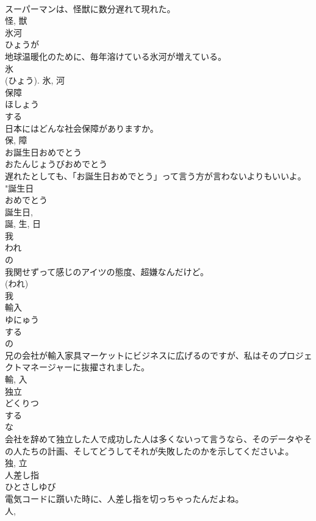\documentclass[8pt]{extreport}
\begin{document}
\begin{CJK}{UTF8}{min}
\\	スーパーマンは、怪獣に数分遅れて現れた。	
\\	怪, 獣	
\\	氷河	
\\	ひょうが	
\\	地球温暖化のために、毎年溶けている氷河が増えている。	
\\	氷 
\\	(ひょう).	氷, 河	
\\	保障	
\\	ほしょう	
\\	する 
\\	日本にはどんな社会保障がありますか。	
\\	保, 障	
\\	お誕生日おめでとう	
\\	おたんじょうびおめでとう	
\\	遅れたとしても、「お誕生日おめでとう」って言う方が言わないよりもいいよ。	
\\	"誕生日 
\\	おめでとう 
\\	誕生日, 
\\	誕, 生, 日	
\\	我	
\\	われ	
\\	の 
\\	我関せずって感じのアイツの態度、超嫌なんだけど。	
\\	(われ) 
\\	我	
\\	輸入	
\\	ゆにゅう	
\\	する 
\\	の 
\\	兄の会社が輸入家具マーケットにビジネスに広げるのですが、私はそのプロジェクトマネージャーに抜擢されました。	
\\	輸, 入	
\\	独立	
\\	どくりつ	
\\	する 
\\	な 
\\	会社を辞めて独立した人で成功した人は多くないって言うなら、そのデータやその人たちの計画、そしてどうしてそれが失敗したのかを示してくださいよ。	
\\	独, 立	
\\	人差し指	
\\	ひとさしゆび	
\\	電気コードに躓いた時に、人差し指を切っちゃったんだよね。	
\\	人, 

\end{CJK}
\end{document}
